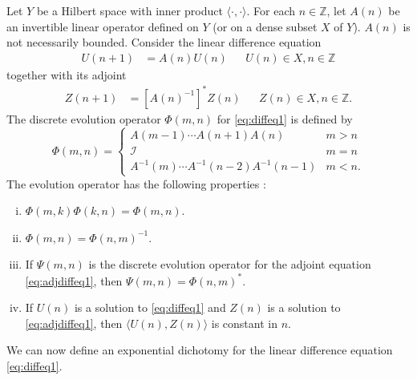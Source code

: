 \documentclass[12pt,reqno]{amsart}
\def\Z{{\mathbb Z}}
\def\id{{\mathcal I}}
\begin{document}
Let $Y$ be a Hilbert space with inner product $\langle \cdot, \cdot \rangle$. For each $n \in \Z$, let $A(n)$ be an invertible linear operator defined on $Y$ (or on a dense subset $X$ of $Y$). $A(n)$ is not necessarily bounded. Consider the linear difference equation
\begin{align}\label{eq:diffeq1}
U(n+1) &= A(n) U(n) && U(n) \in X, n \in \Z
\end{align}
together with its adjoint
\begin{align}\label{eq:adjdiffeq1}
Z(n+1) &= [A(n)^{-1}]^* Z(n) && Z(n) \in X, n \in \Z.
\end{align}
The discrete evolution operator $\Phi(m,n)$ for \cref{eq:diffeq1} is defined by
\begin{equation}\label{eq:evoldiffeq1}
\Phi(m,n) = \begin{cases}
A(m-1) \cdots A(n+1)A(n) & m > n \\
\id & m = n \\
A^{-1}(m) \cdots A^{-1}(n-2) A^{-1}(n-1) & m < n.
\end{cases}
\end{equation}
The evolution operator has the following properties \cites{Palmer1988,Parker2020}:
\begin{enumerate}[(i)]
	\item $\Phi(m,k)\Phi(k,n) = \Phi(m,n)$.
	\item $\Phi(m,n) = \Phi(n,m)^{-1}$.
	\item If $\Psi(m,n)$ is the discrete evolution operator for the adjoint equation \cref{eq:adjdiffeq1}, then $\Psi(m,n) = \Phi(n,m)^*$.
	\item If $U(n)$ is a solution to \cref{eq:diffeq1} and $Z(n)$ is a solution to \cref{eq:adjdiffeq1}, then $\langle U(n), Z(n) \rangle$ is constant in $n$.
\end{enumerate}

We can now define an exponential dichotomy for the linear difference equation \cref{eq:diffeq1}.
\end{document}
